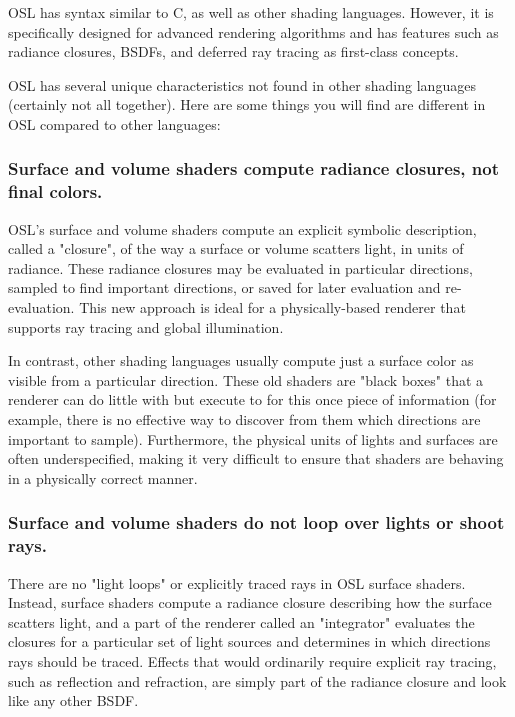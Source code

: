 \documentclass[11pt,letterpaper]{book}
\begin{document}
OSL has syntax similar to C, as well as other shading languages.
However, it is specifically designed for advanced rendering algorithms
and has features such as radiance closures, BSDFs, and deferred ray
tracing as first-class concepts.

OSL has several unique characteristics not found in other shading
languages (certainly not all together).  Here are some things you will
find are different in OSL compared to other languages:

\subsubsection*{Surface and volume shaders compute radiance closures, not final colors.}

  OSL's surface and volume shaders compute an explicit symbolic
  description, called a "closure", of the way a surface or volume
  scatters light, in units of radiance.  These radiance closures may be
  evaluated in particular directions, sampled to find important
  directions, or saved for later evaluation and re-evaluation.
  This new approach is ideal for a physically-based renderer that
  supports ray tracing and global illumination.

  In contrast, other shading languages usually compute just a surface
  color as visible from a particular direction.  These old shaders are
  "black boxes" that a renderer can do little with but execute to for
  this once piece of information (for example, there is no effective way
  to discover from them which directions are important to sample).
  Furthermore, the physical units of lights and surfaces are often
  underspecified, making it very difficult to ensure that shaders are
  behaving in a physically correct manner.

\subsubsection*{Surface and volume shaders do not loop over lights or shoot rays.}

  There are no "light loops" or explicitly traced rays in OSL surface
  shaders.  Instead, surface shaders compute a radiance closure
  describing how the surface scatters light, and a part of the renderer
  called an "integrator" evaluates the closures for a particular set of
  light sources and determines in which directions rays should be
  traced.  Effects that would ordinarily require explicit ray tracing,
  such as reflection and refraction, are simply part of the radiance
  closure and look like any other BSDF.
\end{document}
